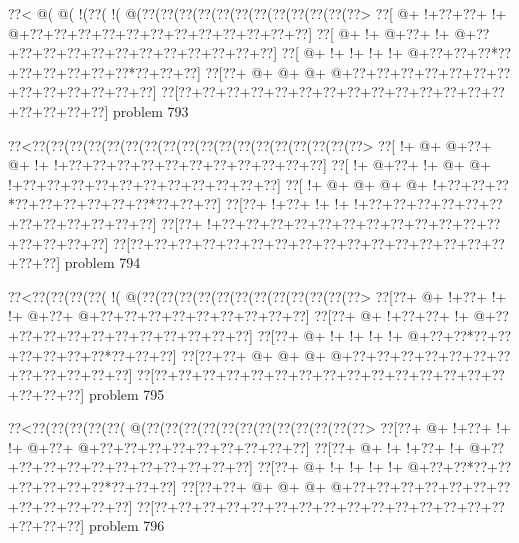 \vbox{\vbox{\goo
\0??<\- @(\- @(\- !(\0??(\- !(\- @(\0??(\0??(\0??(\0??(\0??(\0??(\0??(\0??(\0??(\0??(\0??(\0??>
\0??[\- @+\- !+\0??+\0??+\- !+\- @+\0??+\0??+\0??+\0??+\0??+\0??+\0??+\0??+\0??+\0??+\0??+\0??]
\0??[\- @+\- !+\- @+\0??+\- !+\- @+\0??+\0??+\0??+\0??+\0??+\0??+\0??+\0??+\0??+\0??+\0??+\0??]
\0??[\- @+\- !+\- !+\- !+\- !+\- @+\0??+\0??+\0??*\0??+\0??+\0??+\0??+\0??+\0??*\0??+\0??+\0??]
\0??[\0??+\- @+\- @+\- @+\- @+\0??+\0??+\0??+\0??+\0??+\0??+\0??+\0??+\0??+\0??+\0??+\0??+\0??]
\0??[\0??+\0??+\0??+\0??+\0??+\0??+\0??+\0??+\0??+\0??+\0??+\0??+\0??+\0??+\0??+\0??+\0??+\0??]
}
\hfil problem 793\hfil\break
}



\vbox{\vbox{\goo
\0??<\0??(\0??(\0??(\0??(\0??(\0??(\0??(\0??(\0??(\0??(\0??(\0??(\0??(\0??(\0??(\0??(\0??(\0??>
\0??[\- !+\- @+\- @+\0??+\- @+\- !+\- !+\0??+\0??+\0??+\0??+\0??+\0??+\0??+\0??+\0??+\0??+\0??]
\0??[\- !+\- @+\0??+\- !+\- @+\- @+\- !+\0??+\0??+\0??+\0??+\0??+\0??+\0??+\0??+\0??+\0??+\0??]
\0??[\- !+\- @+\- @+\- @+\- @+\- !+\0??+\0??+\0??*\0??+\0??+\0??+\0??+\0??+\0??*\0??+\0??+\0??]
\0??[\0??+\- !+\0??+\- !+\- !+\- !+\0??+\0??+\0??+\0??+\0??+\0??+\0??+\0??+\0??+\0??+\0??+\0??]
\0??[\0??+\- !+\0??+\0??+\0??+\0??+\0??+\0??+\0??+\0??+\0??+\0??+\0??+\0??+\0??+\0??+\0??+\0??]
\0??[\0??+\0??+\0??+\0??+\0??+\0??+\0??+\0??+\0??+\0??+\0??+\0??+\0??+\0??+\0??+\0??+\0??+\0??]
}
\hfil problem 794\hfil\break
}



\vbox{\vbox{\goo
\0??<\0??(\0??(\0??(\0??(\- !(\- @(\0??(\0??(\0??(\0??(\0??(\0??(\0??(\0??(\0??(\0??(\0??(\0??>
\0??[\0??+\- @+\- !+\0??+\- !+\- !+\- @+\0??+\- @+\0??+\0??+\0??+\0??+\0??+\0??+\0??+\0??+\0??]
\0??[\0??+\- @+\- !+\0??+\0??+\- !+\- @+\0??+\0??+\0??+\0??+\0??+\0??+\0??+\0??+\0??+\0??+\0??]
\0??[\0??+\- @+\- !+\- !+\- !+\- !+\- @+\0??+\0??*\0??+\0??+\0??+\0??+\0??+\0??*\0??+\0??+\0??]
\0??[\0??+\0??+\- @+\- @+\- @+\- @+\0??+\0??+\0??+\0??+\0??+\0??+\0??+\0??+\0??+\0??+\0??+\0??]
\0??[\0??+\0??+\0??+\0??+\0??+\0??+\0??+\0??+\0??+\0??+\0??+\0??+\0??+\0??+\0??+\0??+\0??+\0??]
}
\hfil problem 795\hfil\break
}



\vbox{\vbox{\goo
\0??<\0??(\0??(\0??(\0??(\0??(\- @(\0??(\0??(\0??(\0??(\0??(\0??(\0??(\0??(\0??(\0??(\0??(\0??>
\0??[\0??+\- @+\- !+\0??+\- !+\- !+\- @+\0??+\- @+\0??+\0??+\0??+\0??+\0??+\0??+\0??+\0??+\0??]
\0??[\0??+\- @+\- !+\- !+\0??+\- !+\- @+\0??+\0??+\0??+\0??+\0??+\0??+\0??+\0??+\0??+\0??+\0??]
\0??[\0??+\- @+\- !+\- !+\- !+\- !+\- @+\0??+\0??*\0??+\0??+\0??+\0??+\0??+\0??*\0??+\0??+\0??]
\0??[\0??+\0??+\- @+\- @+\- @+\- @+\0??+\0??+\0??+\0??+\0??+\0??+\0??+\0??+\0??+\0??+\0??+\0??]
\0??[\0??+\0??+\0??+\0??+\0??+\0??+\0??+\0??+\0??+\0??+\0??+\0??+\0??+\0??+\0??+\0??+\0??+\0??]
}
\hfil problem 796\hfil\break
}



